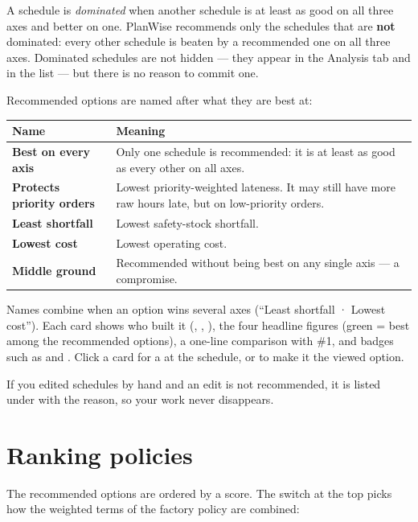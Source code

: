 A schedule is \emph{dominated} when another schedule is at least as good on all three axes and better on one.
PlanWise recommends only the schedules that are \textbf{not} dominated: every other schedule is beaten by a
recommended one on all three axes. Dominated schedules are not hidden --- they appear in the Analysis tab and
in the  list --- but there is no reason to commit one.

Recommended options are named after what they are best at:

\begin{center}
\begin{tabularx}{\linewidth}{>{\bfseries}p{4.2cm}X}
\toprule
\rowcolor{white}Name & Meaning \\
\midrule
Best on every axis & Only one schedule is recommended: it is at least as good as every other on all axes. \\
Protects priority orders & Lowest priority-weighted lateness. It may still have more raw hours late, but on low-priority orders. \\
Least shortfall & Lowest safety-stock shortfall. \\
Lowest cost & Lowest operating cost. \\
Middle ground & Recommended without being best on any single axis --- a compromise. \\
\bottomrule
\end{tabularx}
\end{center}

Names combine when an option wins several axes (``Least shortfall · Lowest cost''). Each card shows who built
it (, , ), the four
headline figures (green = best among the recommended options), a one-line comparison with \#1, and badges such
as  and . Click a card for a  at the schedule, or to make it the
viewed option.

If you edited schedules by hand and an edit is not recommended, it is listed under  with the reason, so your work never disappears.

\section{Ranking policies}\label{sec:ranking}

The recommended options are ordered by a score. The switch at the top picks how the weighted terms of the
factory policy are combined:

